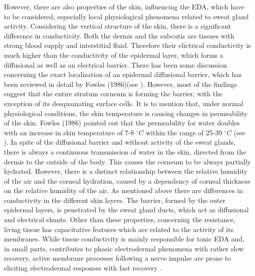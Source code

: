 However, there are also properties of the skin, influencing the EDA, which have to be considered, especially local physiological phenomena related to sweat gland activity. Considering the vertical structure of the skin, there is a significant difference in conductivity. Both the dermis and the subcutis are tissues with strong blood supply and interstitial fluid. Therefore their elictrical conductivity is much higher than the conductivity of the epidermal layer, which forms a diffusional as well as an electrical barrier. There has been some discussion concerning the exact localization of an epidermal diffusional barrier, which has been reviewed in detail by Fowles (1986)(see \citep{boucsein2013electrodermal}). However, most of the findings suggest that the entire stratum corneum is forming the barrier, with the exception of its desquamating surface cells\citep{boucsein2013electrodermal}. 
It is to mention that, under normal physiological conditions, the skin temperature is causing changes in permeability of the skin. Fowles (1986) pointed out that the permeability for water doubles with an increase in skin temperature of 7-8  $^{\circ}C$  within the range of 25-39 $^{\circ}C$ (see \citep{boucsein2013electrodermal}). In spite of the diffusional barrier and without activity of the sweat glands, there is always a continuous transmission of water in the skin, directed from the dermis to the outside of the body. This causes the corneum to be always partially hydrated. However, there is a distinct relationship between the relative humidity of the air and the corneal hydration, caused by a dependency of corneal thickness on the relative humidity of the air. As mentioned above there are differences in conductivity in the different skin layers. The barrier, formed by the outer epidermal layers, is penetrated by the sweat gland ducts, which act as diffusional and electrical shunts.
Other than these properties, concerning the resistance, living tissue has capacitative features which are related to the activity of its membranes. While tissue conductivity is mainly responsible for tonic EDA and, in small parts, contributes to phasic electrodermal phenomena with rather slow recovery, active membrane processes following a nerve impulse are prone to eliciting electrodermal responses with fast recovery \citep{boucsein2013electrodermal}.

